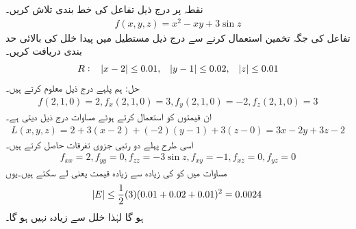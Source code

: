 نقطہ  پر درج ذیل تفاعل کی خط بندی  تلاش کریں۔
\begin{align*}
f(x,y,z)=x^2-xy+3\sin z
\end{align*}
تفاعل  کی جگہ تخمین  استعمال کرنے سے درج ذیل مستطیل میں   پیدا خلل کی بالائی حد بندی دریافت کریں۔
\begin{align*}
R:\quad \abs{x-2}\le 0.01,\quad \abs{y-1}\le 0.02,\quad \abs{z}\le 0.01
\end{align*}
حل:\quad
ہم پلہے درج ذیل معلوم کرتے ہیں۔
\begin{align*}
f(2,1,0)=2, f_x(2,1,0)=3, f_y(2,1,0)=-2,f_z(2,1,0)=3
\end{align*}
ان قیمتوں کو استعمال کرتے ہوئے  مساوات  درج ذیل دیتی ہے۔
\begin{align*}
L(x,y,z)=2+3(x-2)+(-2)(y-1)+3(z-0)=3x-2y+3z-2
\end{align*}
اسی طرح پہلے دو رتبی جزوی تفرقات حاصل کرتے ہیں۔
\begin{align*}
f_{xx}=2, f_{yy}=0, f_{zz}=-3\sin z, f_{xy}=-1,f_{xz}=0,f_{yz}=0
\end{align*}
مساوات  میں  کو  کی زیادہ سے زیادہ قیمت یعنی  لے سکتے ہیں۔یوں 
\begin{align*}
\abs{E}\le \frac{1}{2}(3)(0.01+0.02+0.01)^2=0.0024
\end{align*}
ہو گا لہٰذا خلل  سے زیادہ نہیں ہو گا۔
